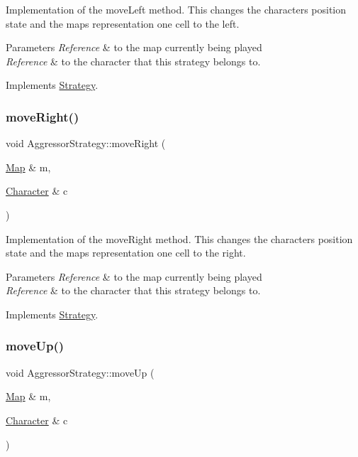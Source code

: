 Implementation of the move\+Left method. This changes the character\textquotesingle{}s position state and the map\textquotesingle{}s representation one cell to the left. 
\begin{DoxyParams}{Parameters}
{\em Reference} & to the map currently being played \\
\hline
{\em Reference} & to the character that this strategy belongs to. \\
\hline
\end{DoxyParams}


Implements \hyperlink{classStrategy}{Strategy}.

\hypertarget{classAggressorStrategy_ab1c1e6cba68e2b2c568548916cf0fe33}{}\label{classAggressorStrategy_ab1c1e6cba68e2b2c568548916cf0fe33} 
\subsubsection{\texorpdfstring{move\+Right()}{moveRight()}}
{\footnotesize\ttfamily void Aggressor\+Strategy\+::move\+Right (\begin{DoxyParamCaption}\item[{\hyperlink{classMap}{Map} \&}]{m,  }\item[{\hyperlink{classCharacter}{Character} \&}]{c }\end{DoxyParamCaption})\hspace{0.3cm}{\ttfamily [virtual]}}

Implementation of the move\+Right method. This changes the character\textquotesingle{}s position state and the map\textquotesingle{}s representation one cell to the right. 
\begin{DoxyParams}{Parameters}
{\em Reference} & to the map currently being played \\
\hline
{\em Reference} & to the character that this strategy belongs to. \\
\hline
\end{DoxyParams}


Implements \hyperlink{classStrategy}{Strategy}.

\hypertarget{classAggressorStrategy_a75cdb4e9da29d676e7ae8ae521be9305}{}\label{classAggressorStrategy_a75cdb4e9da29d676e7ae8ae521be9305} 
\subsubsection{\texorpdfstring{move\+Up()}{moveUp()}}
{\footnotesize\ttfamily void Aggressor\+Strategy\+::move\+Up (\begin{DoxyParamCaption}\item[{\hyperlink{classMap}{Map} \&}]{m,  }\item[{\hyperlink{classCharacter}{Character} \&}]{c }\end{DoxyParamCaption})\hspace{0.3cm}{\ttfamily [virtual]}}

